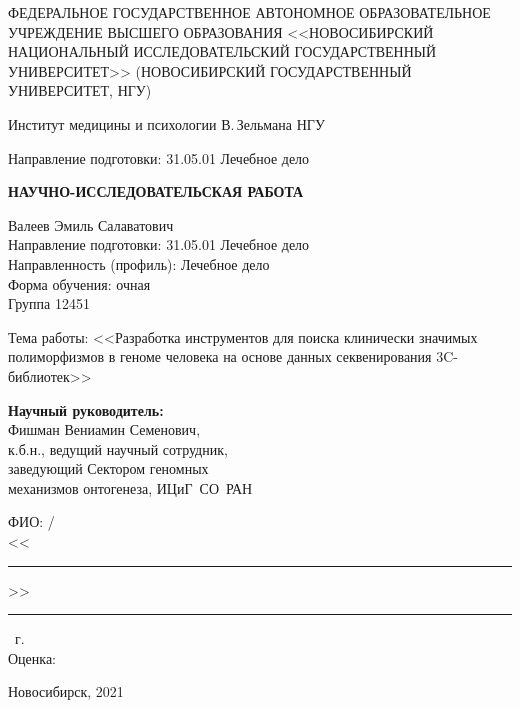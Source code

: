 \documentclass[a4paper,14pt]{extarticle}
\begin{document}
\begin{titlepage}
	\centering
	{\par\small{ФЕДЕРАЛЬНОЕ ГОСУДАРСТВЕННОЕ АВТОНОМНОЕ ОБРАЗОВАТЕЛЬНОЕ УЧРЕЖДЕНИЕ ВЫСШЕГО ОБРАЗОВАНИЯ <<НОВОСИБИРСКИЙ НАЦИОНАЛЬНЫЙ ИССЛЕДОВАТЕЛЬСКИЙ ГОСУДАРСТВЕННЫЙ УНИВЕРСИТЕТ>> (НОВОСИБИРСКИЙ ГОСУДАРСТВЕННЫЙ УНИВЕРСИТЕТ, НГУ)}}
	{\par\small{Институт медицины и психологии В.\,Зельмана НГУ}}
	{\par\small{Направление подготовки: 31.05.01 Лечебное дело}}

	\vspace{3cm}

	{\par\Large\textbf{НАУЧНО-ИССЛЕДОВАТЕЛЬСКАЯ РАБОТА}}

	\vspace{0.5cm}

	Валеев Эмиль Салаватович\\
	Направление подготовки: 31.05.01 Лечебное дело\\
	Направленность (профиль): Лечебное дело\\
	Форма обучения: очная\\
	Группа 12451

	\vspace{0.5cm}

	Тема работы: <<Разработка инструментов для поиска клинически значимых полиморфизмов в геноме человека на основе данных секвенирования 3C\hyp{}библиотек>>

	\vfill

	\hfill
	\begin{minipage}{0.57\textwidth}

		\textbf{Научный руководитель:}\\
		Фишман Вениамин Семенович,\\
		к.б.н., ведущий научный сотрудник,\\
		заведующий Сектором геномных\\
		механизмов онтогенеза, ИЦиГ~СО~РАН

		\vspace{1cm}

		ФИО: \hrulefill/\hrulefill\\
		<<\rule{2em}{0.4pt}>>\rule{2em}{0.4pt}~г.\\
		Оценка: \hrulefill\\
	\end{minipage}

	\vfill

	{\centering\small{Новосибирск, 2021}}
\end{titlepage}
\end{document}
